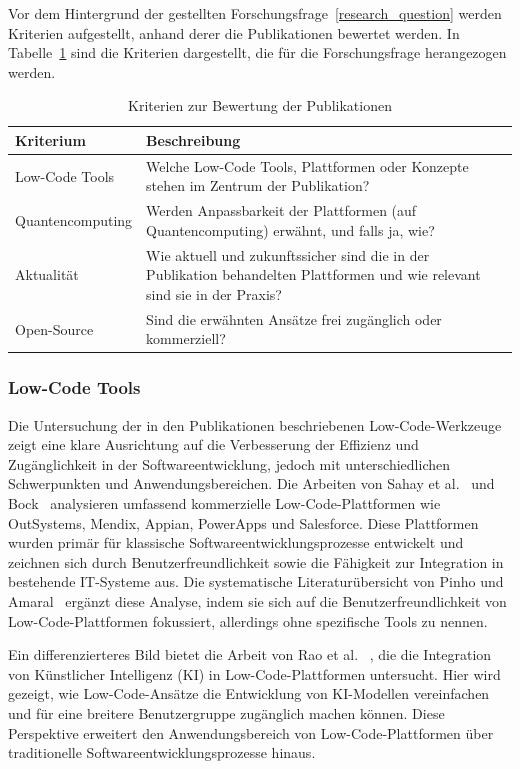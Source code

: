 Vor dem Hintergrund der gestellten Forschungsfrage~\ref{research_question} werden Kriterien aufgestellt, anhand derer die Publikationen 
bewertet werden. In Tabelle~\ref{tab:evaluation_criteria} sind die Kriterien dargestellt, die für die Forschungsfrage 
herangezogen werden. 

\begin{table}[h!]
    \centering
    \caption{Kriterien zur Bewertung der Publikationen}
    \label{tab:evaluation_criteria}
    \begin{tabular}{|p{5cm}|p{9cm}|}
    \hline
    \textbf{Kriterium} & \textbf{Beschreibung} \\ \hline
    Low-Code Tools & Welche Low-Code Tools, Plattformen oder Konzepte stehen im Zentrum der Publikation? \\ \hline
    Quantencomputing & Werden Anpassbarkeit der Plattformen (auf Quantencomputing) erwähnt, und falls ja, wie? \\ \hline
    Aktualität & Wie aktuell und zukunftssicher sind die in der Publikation behandelten Plattformen und wie relevant sind sie in der Praxis? \\ \hline
    Open-Source & Sind die erwähnten Ansätze frei zugänglich oder kommerziell? \\ \hline
    \end{tabular}
\end{table}

\subsubsection{Low-Code Tools}
Die Untersuchung der in den Publikationen beschriebenen Low-Code-Werkzeuge zeigt eine klare Ausrichtung auf die Verbesserung der 
Effizienz und Zugänglichkeit in der Softwareentwicklung, jedoch mit unterschiedlichen Schwerpunkten und Anwendungsbereichen. 
Die Arbeiten von Sahay et al.~\cite{Sahay_2020} und Bock~\cite{Bock_2021_essence} analysieren umfassend kommerzielle 
Low-Code-Plattformen wie OutSystems, Mendix, Appian, PowerApps und Salesforce. Diese Plattformen wurden primär für klassische 
Softwareentwicklungsprozesse entwickelt und zeichnen sich durch Benutzerfreundlichkeit sowie die Fähigkeit zur Integration in 
bestehende IT-Systeme aus. Die systematische Literaturübersicht von Pinho und Amaral~\cite{Pinho_2022} ergänzt diese 
Analyse, indem sie sich auf die Benutzerfreundlichkeit von Low-Code-Plattformen fokussiert, allerdings ohne spezifische Tools 
zu nennen.

Ein differenzierteres Bild bietet die Arbeit von Rao et al. ~\cite{rao2024}, die die Integration von Künstlicher Intelligenz 
(KI) in Low-Code-Plattformen untersucht. Hier wird gezeigt, wie Low-Code-Ansätze die Entwicklung von KI-Modellen vereinfachen und 
für eine breitere Benutzergruppe zugänglich machen können. Diese Perspektive erweitert den Anwendungsbereich von Low-Code-Plattformen 
über traditionelle Softwareentwicklungsprozesse hinaus.

